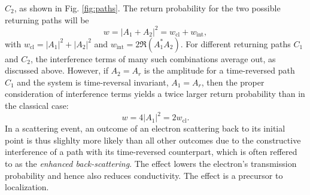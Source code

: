 \documentclass[10pt,a4paper]{article}
\begin{document}
 $C_2$, as shown in Fig. \ref{fig:paths}. The return probability for the two possible returning paths will be 
\begin{equation}
w=|A_1 + A_2|^2=w_\mathrm{cl} + w_\mathrm{int},
\end{equation}
with $w_\mathrm{cl}=|A_1|^2 + |A_2|^2$ and $w_\mathrm{int}=2\Re\left(A_1^*A_2\right)$. For different returning paths $C_1$ and $C_2$, the interference terms of many such combinations average out, as discussed above. However, if $A_2=A_r$ is the amplitude for a time-reversed path $C_1$ and the system is time-reversal invariant, $A_1=A_r$, then the proper consideration of interference terms yields a twice larger return probability than in the classical case:
\begin{equation}
w=4|A_1|^2=2w_\mathrm{cl}.
\end{equation}
In a scattering event, an outcome of an electron scattering back to its initial point is thus slighlty more likely than all other outcomes due to the constructive interference of a path with its time-reversed counterpart, which is often reffered to as the \emph{enhanced back-scattering}. The effect lowers the electron's transmission probability and hence also reduces conductivity. The effect is a precursor to localization.
\end{document}
